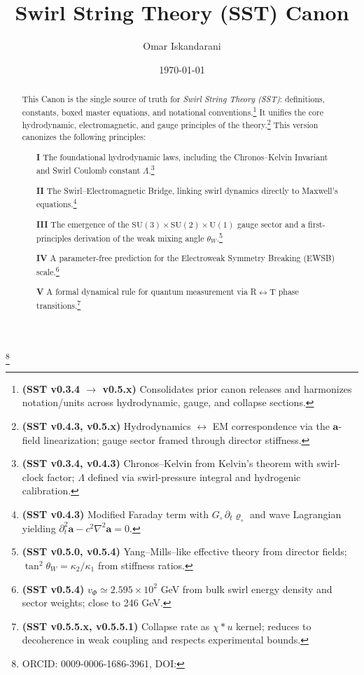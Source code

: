 \documentclass[reprint,aps,onecolumn,nofootinbib]{revtex4-2}
\newcommand{\Lam}{\Lambda}                               %
\begin{document}
\title{Swirl String Theory (SST) Canon \canonversion}
\author{Omar Iskandarani}
\thanks{ORCID: 0009-0006-1686-3961, DOI: \paperdoi}
\date{\today}
\begin{abstract}
This Canon is the single source of truth for \emph{Swirl String Theory (SST)}: definitions, constants, boxed master equations, and notational conventions.\footnote{\textbf{(SST v0.3.4 $\rightarrow$ v0.5.x)} Consolidates prior canon releases and harmonizes notation/units across hydrodynamic, gauge, and collapse sections.} It unifies the core hydrodynamic, electromagnetic, and gauge principles of the theory.\footnote{\textbf{(SST v0.4.3, v0.5.x)} Hydrodynamics $\leftrightarrow$ EM correspondence via the $\mathbf{a}$-field linearization; gauge sector framed through director stiffness.} This version canonizes the following principles:
\begin{itemize}
\item[\textbf{I}] The foundational hydrodynamic laws, including the Chronos–Kelvin Invariant and Swirl Coulomb constant $\Lam$.\footnote{\textbf{(SST v0.3.4, v0.4.3)} Chronos–Kelvin from Kelvin’s theorem with swirl-clock factor; $\Lambda$ defined via swirl-pressure integral and hydrogenic calibration.}
\item[\textbf{II}] The Swirl–Electromagnetic Bridge, linking swirl dynamics directly to Maxwell's equations.\footnote{\textbf{(SST v0.4.3)} Modified Faraday term with $G_{\circ}\,\partial_t\varrho_{\circ}$ and wave Lagrangian yielding $\partial_t^2\mathbf{a}-c^2\nabla^2\mathbf{a}=0$.}
\item[\textbf{III}] The emergence of the $\mathrm{SU}(3)\times\mathrm{SU}(2)\times\mathrm{U}(1)$ gauge sector and a first-principles derivation of the weak mixing angle $\theta_W$.\footnote{\textbf{(SST v0.5.0, v0.5.4)} Yang–Mills–like effective theory from director fields; $\tan^2\theta_W=\kappa_2/\kappa_1$ from stiffness ratios.}
\item[\textbf{IV}] A parameter-free prediction for the Electroweak Symmetry Breaking (EWSB) scale.\footnote{\textbf{(SST v0.5.4)} $v_\Phi\simeq 2.595\times10^2$ GeV from bulk swirl energy density and sector weights; close to 246 GeV.}
\item[\textbf{V}] A formal dynamical rule for quantum measurement via R$\leftrightarrow$T phase transitions.\footnote{\textbf{(SST v0.5.5.x, v0.5.5.1)} Collapse rate as $\chi\!*u$ kernel; reduces to decoherence in weak coupling and respects experimental bounds.}
\end{itemize}


\end{abstract}
\end{document}
